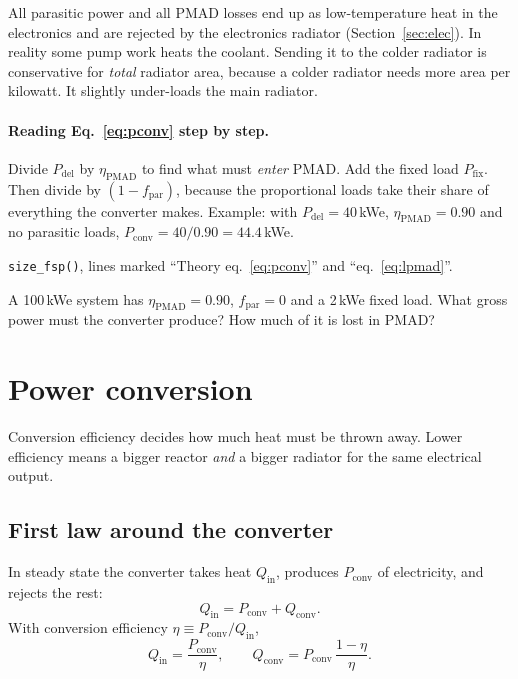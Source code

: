 \documentclass[11pt]{article}
\numberwithin{equation}{section}
\numberwithin{table}{section}
\newcommand{\Pdel}{P_\text{del}}
\newcommand{\Pconv}{P_\text{conv}}
\begin{document}
\begin{assume}
All parasitic power and all PMAD losses end up as low-temperature heat in the
electronics and are rejected by the electronics radiator (Section~\ref{sec:elec}).
In reality some pump work heats the coolant. Sending it to the colder radiator is
conservative for \emph{total} radiator area, because a colder radiator needs more area
per kilowatt. It slightly under-loads the main radiator.
\end{assume}

\paragraph{Reading Eq.~\eqref{eq:pconv} step by step.} Divide $\Pdel$ by
$\eta_\text{PMAD}$ to find what must \emph{enter} PMAD. Add the fixed load $P_\text{fix}$.
Then divide by $(1-f_\text{par})$, because the proportional loads take their share of
everything the converter makes. Example: with $\Pdel=40$\,kWe, $\eta_\text{PMAD}=0.90$ and no
parasitic loads, $\Pconv = 40/0.90 = 44.4$\,kWe.

\begin{code}
\texttt{size\_fsp()}, lines marked ``Theory eq.~\ref{eq:pconv}'' and ``eq.~\ref{eq:lpmad}''.
\end{code}

\begin{tryit}[label=try:pconv]
A 100\,kWe system has $\eta_\text{PMAD}=0.90$, $f_\text{par}=0$ and a 2\,kWe fixed load. What
gross power must the converter produce? How much of it is lost in PMAD?
\end{tryit}

\section{Power conversion}\label{sec:eta}

\begin{keyidea}
Conversion efficiency decides how much heat must be thrown away. Lower efficiency means
a bigger reactor \emph{and} a bigger radiator for the same electrical output.
\end{keyidea}

\subsection{First law around the converter}
In steady state the converter takes heat $Q_\text{in}$, produces $\Pconv$ of
electricity, and rejects the rest:
\begin{equation}
  Q_\text{in} = \Pconv + Q_\text{conv}.
  \label{eq:firstlaw}
\end{equation}
With conversion efficiency $\eta \equiv \Pconv/Q_\text{in}$,
\begin{equation}
  Q_\text{in} = \frac{\Pconv}{\eta}, \qquad
  Q_\text{conv} = \Pconv\,\frac{1-\eta}{\eta}.
  \label{eq:qin}
\end{equation}
\end{document}
